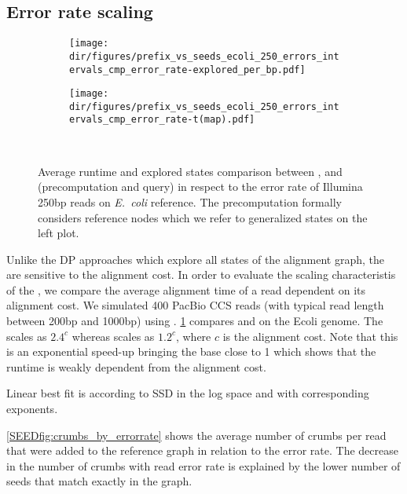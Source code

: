 \subsection{Error rate scaling}
\begin{figure}[t]
  \begin{subfigure}{.49\textwidth}
    \centering
    \texttt{[image: \\dir/figures/prefix\_vs\_seeds\_ecoli\_250\_errors\_intervals\_cmp\_error\_rate-explored\_per\_bp.pdf]}
  \end{subfigure}%
  \begin{subfigure}{.45\textwidth}
    \centering
    \texttt{[image: \\dir/figures/prefix\_vs\_seeds\_ecoli\_250\_errors\_intervals\_cmp\_error\_rate-t(map).pdf]}
  \end{subfigure}~\hspace{1em} \caption{Average runtime and explored states
  comparison between \dijkstra, \prefixh and \seedh (precomputation and query)
  in respect to the error rate of Illumina 250bp reads on \textit{E.~coli}
  reference. The \seedh precomputation formally considers reference nodes which
  we refer to generalized states on the left plot. }
  \label{SEEDfig:scaling_with_errorrate}
\end{figure}

Unlike the DP approaches which explore all states of the alignment graph, the \A
are sensitive to the alignment cost. In order to evaluate the scaling
characteristis of the \seedh, we compare the average alignment time of a read
dependent on its alignment cost. We simulated 400 PacBio CCS reads (with typical
read length between 200bp and 1000bp) using \randomreads.
\cref{SEEDfig:scaling_with_errorrate} compares \seedh and \prefixh on the Ecoli
genome. The \prefixh scales as $2.4^c$ whereas \seedh scales as $1.2^c$, where
$c$ is the alignment cost. Note that this is an exponential speed-up bringing
the base close to 1 which shows that the runtime is weakly dependent from the
alignment cost.

Linear best fit is according to SSD in the log space and with corresponding exponents.

\cref{SEEDfig:crumbs_by_errorrate} shows the average number of crumbs per read that
were added to the reference graph in relation to the error rate. The decrease in
the number of crumbs with read error rate is explained by the lower number of
seeds that match exactly in the graph.